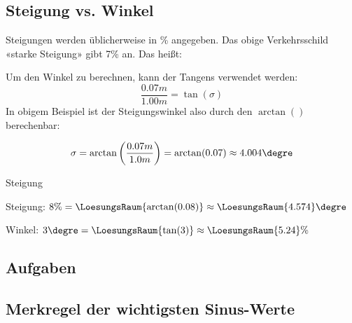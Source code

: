 


\newpage


\subsection{Steigung vs. Winkel}

Steigungen werden üblicherweise in \% angegeben. Das obige
Verkehrsschild «starke Steigung» gibt 7\% an. Das heißt:


Um den Winkel zu berechnen, kann der Tangens verwendet werden:
$$\frac{0.07m}{1.00m} = \tan(\sigma)$$
In obigem Beispiel ist der Steigungswinkel also durch den $\arctan()$
berechenbar:

$$\sigma = \arctan\left(\frac{0.07m}{1.0m}\right) = \arctan(0.07) \approx 4.004\degre$$
\newpage
\begin{beispiel}{Steigung}{}

  
  Steigung: $8\% = \LoesungsRaum{\arctan(0.08)} \approx \LoesungsRaum{4.574}\degre$

  Winkel: $3\degre = \LoesungsRaum{\tan(3)} \approx
  \LoesungsRaum{5.24}\%$

  
  \end{beispiel}


\subsection*{Aufgaben}
\newpage



\subsection{Merkregel der wichtigsten Sinus-Werte}

